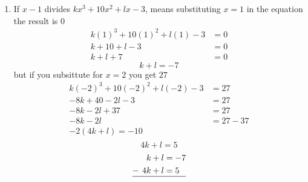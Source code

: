 \begin{multicols}{2}
\begin{enumerate}[label={\textbf{\arabic*.}}]
    \item If $x-1$ divides $kx^3+10x^2+lx-3$, means substituting $x=1$ in the equation the result is $0$ 
    \begin{align*}
        k(1)^3+10(1)^2+l(1)-3 &= 0 \\
        k + 10 + l - 3 &= 0 \\
        k + l + 7 &= 0 
    \end{align*} 
    \begin{equation}
        k + l = -7
    \end{equation} \vspace{-5pt}
    but if you subsittute for $x = 2$ you get $27$ \\ \vspace{-10pt}
    \begin{align*}
        k(-2)^3 + 10(-2)^2 + l(-2) - 3 &= 27 \\
        -8k + 40 -2l -3 &= 27 \\
        -8k - 2l + 37 &= 27 \\
        -8k -2l &= 27 - 37 \\
        -2(4k + l) = -10 \\
    \end{align*}
    \begin{equation} 
        4k + l = 5
    \end{equation}
    \begin{align*} \vspace{-10pt}
        k + l &= -7 \\
       -\hspace{4pt} 4k + l  &= 5 \\
       \hline
    \end{align*}


\end{enumerate}
\end{multicols}
